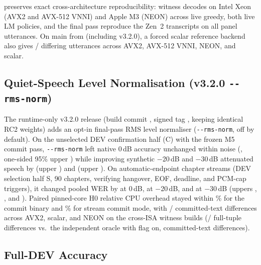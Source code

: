 \ultra{} preserves exact cross-architecture reproducibility: \CandIsaRuns{} witness decodes on Intel
Xeon (AVX2 and AVX-512 VNNI) and Apple M3 (NEON) across live greedy, both live LM policies, and the
final pass reproduce the Zen~2 transcripts on all \ScalarUtts{} panel utterances. On main from
\ScalarMainCommit{} (including v3.2.0), a forced scalar reference backend also gives
\ScalarDiffs/\ScalarUtts{} differing utterances across AVX2, AVX-512 VNNI, NEON, and scalar.



\subsection{Quiet-Speech Level Normalisation (v3.2.0 \texttt{-{}-rms-norm})}\label{sec:level}

The runtime-only v3.2.0 release (build commit \VThreeTwoBuildCommit{}, signed tag \VThreeTwoTagObject{},
keeping identical \ReleaseVer{} RC2 weights) adds an opt-in final-pass RMS level normaliser
(\texttt{-{}-rms-norm}, off by default). On the unselected DEV confirmation half (C) with the frozen M5
commit pass, \texttt{-{}-rms-norm} left native 0\,dB accuracy unchanged within noise
(\AudioZOneCleanDelta\pp, one-sided 95\% upper \AudioZOneCleanUpper\pp) while improving synthetic
$-$20\,dB and $-$30\,dB attenuated speech by \AudioZOneTwentyDelta\pp (upper \AudioZOneTwentyUpper\pp)
and \AudioZOneThirtyDelta\pp (upper \AudioZOneThirtyUpper\pp). On automatic-endpoint chapter streams
(DEV selection half S, 90 chapters, verifying hangover, EOF, deadline, and PCM-cap triggers), it changed
pooled WER by \AudioZOneAutoCleanDelta\pp at 0\,dB, \AudioZOneAutoTwentyDelta\pp at $-$20\,dB, and
\AudioZOneAutoThirtyDelta\pp at $-$30\,dB (uppers \AudioZOneAutoCleanUpper{},
\AudioZOneAutoTwentyUpper{}, and \AudioZOneAutoThirtyUpper\pp). Paired pinned-core H0 relative CPU
overhead stayed within \AudioZOneCpuEngineUpper\% for the commit binary and \AudioZOneCpuStreamUpper\%
for stream commit mode, with \AudioZOneCrossIsaDiffs/\AudioZOneCrossIsaClips{} committed-text
differences across AVX2, scalar, and NEON on the \AudioZOneCrossIsaCommit{} cross-ISA witness builds
(\AudioZOneOracleTupleDiffs/\AudioZOneCrossIsaClips{} full-tuple differences vs.\ the independent
oracle with flag on, \AudioZOneCrossIsaDiffs{} committed-text differences).

\subsection{Full-DEV Accuracy}\label{sec:fulldev}

